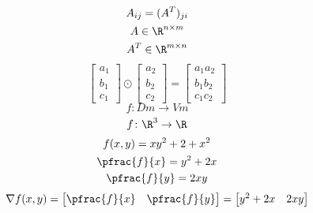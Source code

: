 \documentclass[../SOP.tex]{subfile}
\begin{document}
\begin{gather*}
  A_{ij}=(A^T)_{ji}\\
  A\in \R^{n\times m}\\
  A^T \in \R^{m\times n}
\end{gather*}
\begin{equation*}
  \begin{bmatrix}
  a_1 \\ b_1 \\ c_1
  \end{bmatrix}
  \odot
  \begin{bmatrix}
    a_2 \\ b_2 \\ c_2
  \end{bmatrix}
  =
  \begin{bmatrix}
    a_1a_2 \\ b_1b_2 \\ c_1c_2
  \end{bmatrix}
\end{equation*}
\begin{equation*}
  f\colon Dm \rightarrow Vm
\end{equation*}
\begin{equation*}
  f\colon \R^3 \rightarrow \R
\end{equation*}
\begin{gather*}
  f(x,y)=xy^2+2+x^2\\
  \pfrac{f}{x}=y^2+2x\\
  \pfrac{f}{y}=2xy
\end{gather*}
\begin{equation*}
  \nabla f(x,y) = \begin{bmatrix}
    \pfrac{f}{x} & \pfrac{f}{y}
  \end{bmatrix}
  =
  \begin{bmatrix}
    y^2+2x & 2xy
  \end{bmatrix}
\end{equation*}
\end{document}
